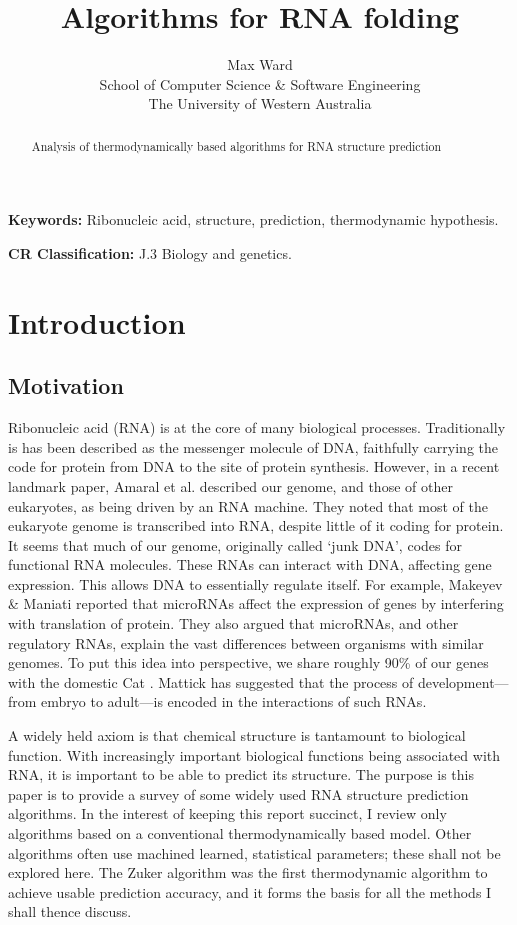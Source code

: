 \documentclass[12pt, a4paper]{article}
\title{Algorithms for RNA folding}
\author{Max Ward \\
School of Computer Science \& Software Engineering \\
The University of Western Australia}
\begin{document}
\maketitle

\begin{abstract}
Analysis of thermodynamically based algorithms for RNA structure prediction
\end{abstract}


{\bf Keywords:} Ribonucleic acid, structure, prediction, thermodynamic hypothesis.

{\bf CR Classification:} J.3 Biology and genetics.

\clearpage


\section{Introduction}
\subsection{Motivation}
Ribonucleic acid (RNA) is at the core of many biological processes. Traditionally is has been described as the messenger molecule of DNA, faithfully carrying the code for protein from DNA to the site of protein synthesis. However, in a recent landmark paper, Amaral et al. \cite{amaral2008eukaryotic} described our genome, and those of other eukaryotes, as being driven by an RNA machine. They noted that most of the eukaryote genome is transcribed into RNA, despite little of it coding for protein. It seems that much of our genome, originally called `junk DNA', codes for functional RNA molecules. These RNAs can interact with DNA, affecting gene expression. This allows DNA to essentially regulate itself. For example, Makeyev \& Maniati \cite{makeyev2008multilevel} reported that microRNAs affect the expression of genes by interfering with translation of protein. They also argued that microRNAs, and other regulatory RNAs, explain the vast differences between organisms with similar genomes. To put this idea into perspective, we share roughly 90\% of our genes with the domestic Cat \cite{pontius2007initial}. Mattick \cite{mattick2007new} has suggested that the process of development---from embryo to adult---is encoded in the interactions of such RNAs.

A widely held axiom is that chemical structure is tantamount to biological function. With increasingly important biological functions being associated with RNA, it is important to be able to predict its structure. The purpose is this paper is to provide a survey of some widely used RNA structure prediction algorithms. In the interest of keeping this report succinct, I review only algorithms based on a conventional thermodynamically based model. Other algorithms often use machined learned, statistical parameters; these shall not be explored here. The Zuker algorithm was the first thermodynamic algorithm to achieve usable prediction accuracy, and it forms the basis for all the methods I shall thence discuss.
\end{document}
